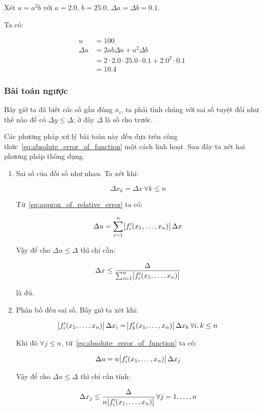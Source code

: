 \documentclass[../../Lectures.tex]{subfiles}
\begin{document}
\begin{exmp}
    Xét \(u = a^2 b\) với \(a = \num{2.0}\), \(b = \num{25.0}\), \(\Delta a =
    \Delta b = \num{0.1}\).

    Ta có:

    \begin{align*}
               u &= 100 \\
        \Delta u &= 2ab \Delta a + a^2 \Delta b \\
                 &= 2 \cdot \num{2.0} \cdot \num{25.0} \cdot \num{0.1} + \num{2.0}^2 \cdot \num{0.1} \\
                 &= \num{10.4}
    \end{align*}
\end{exmp}

\subsubsection{Bài toán ngược}

Bây giờ ta đã biết các số gần đúng \(x_i\), ta phải tính chúng với sai số tuyệt
đối như thế nào để có \(\Delta y \leq \Delta\); ở đây \(\Delta\) là số cho
trước.

Các phương pháp xử lý bài toán này đều dựa trên công thức~\ref{eq:absolute_error_of_function}
một cách linh hoạt. Sau đây ta xét hai phương pháp thông dụng.

\begin{enumerate}
    \item Sai số của  đối số như nhau.
        Ta xét khi:

        \[\Delta x_k = \Delta x \, \forall k \leq n\]

        Từ~\ref{eq:approx_of_relative_error} ta có:

        \[\Delta u = \sum_{i=1}^{n} \abs{f'_i(x_1, \ldots, x_n)} \Delta x\]

        Vậy để cho \(\Delta u \leq \Delta\) thì chỉ cần:

        \begin{equation}\label{eq:same_error}
            \Delta x \leq \frac{\Delta}{\sum_{i=1}^{n} \abs{f'_i(x_1, \ldots, x_n)}}
        \end{equation}

        là đủ.

    \item Phân bố đều sai số.
        Bây giờ ta xét khi:

        \[\abs{f'_i(x_1, \ldots, x_n)} \Delta x_i = \abs{f'_k(x_1, \ldots, x_n)} \Delta x_k \, \forall i, k \leq n\]

        Khi đó \(\forall j \leq n\), từ~\ref{eq:absolute_error_of_function} ta có:

        \[\Delta u = n \abs{f'_i(x_1, \ldots, x_n)} \Delta x_j\]

        Vậy để cho \(\Delta u \leq \Delta\) thì chỉ cần tính:

        \begin{equation}\label{eq:evenly_distributed_error}
            \Delta x_j \leq \frac{\Delta}{n \abs{f'_i(x_1, \ldots, x_n)}} \, \forall j = 1, \ldots, n
        \end{equation}
\end{enumerate}
\end{document}

